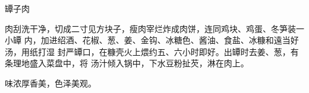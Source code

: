 \begin{recipe}{罈子肉}

\ingredients


\preparation

肉刮洗干净，切成二寸见方块子，瘦肉宰烂炸成肉饼，连同鸡块、鸡蛋、冬笋装一小罈
内，加进绍酒、花椒、葱、姜、金钩、冰糖色、酱油、食盐、冰糠和遠当好汤，用纸打湿
封严罈口，在糠壳火上煨约五、六小时即好。出罈时去姜、葱，有条理地盛入菜盘中，将
汤汁倾入锅中，下水豆粉扯芡，淋在肉上。

\features

味浓厚香美，色泽美观。

\end{recipe}

